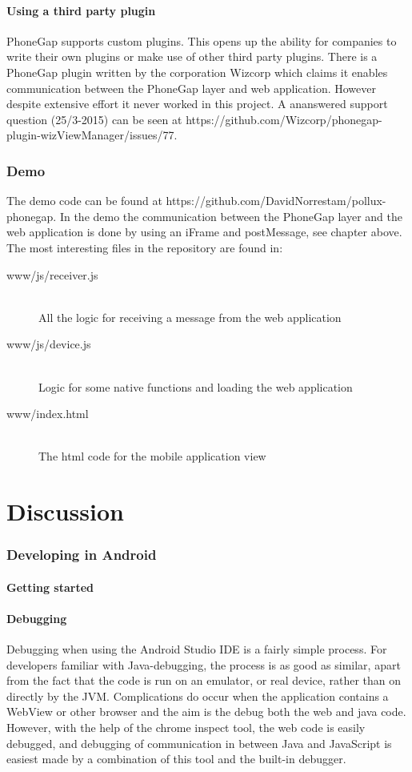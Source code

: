 \documentclass{cslthse-msc}
\begin{document}
\subsubsection{Using a third party plugin}
PhoneGap supports custom plugins. This opens up the ability for companies to write their own plugins or make use of other third party plugins.
\newline\newline
There is a PhoneGap plugin written by the corporation Wizcorp which claims it enables communication between the PhoneGap layer and web application. However despite extensive effort it never worked in this project. A ananswered support question (25/3-2015) can be seen at https://github.com/Wizcorp/phonegap-plugin-wizViewManager/issues/77. 

\subsection{Demo}
The demo code can be found at https://github.com/DavidNorrestam/pollux-phonegap. In the demo the communication between the PhoneGap layer and the web application is done by using an iFrame and postMessage, see chapter above. The most interesting files in the repository are found in:

\begin{description}
  \item[www/js/receiver.js] \hfill \\
    All the logic for receiving a message from the web application
  \item[www/js/device.js] \hfill \\
    Logic for some native functions and loading the web application
  \item[www/index.html] \hfill \\
    The html code for the mobile application view
\end{description}

\chapter{Discussion}
\subsection{Developing in Android}
\subsubsection{Getting started}
\subsubsection{Debugging}
Debugging when using the Android Studio IDE is a fairly simple process. For developers familiar with Java-debugging, the process is as good as similar, apart from the fact that the code is run on an emulator, or real device, rather than on directly by the JVM. Complications do occur when the application contains a WebView or other browser and the aim is the debug both the web and java code. However, with the help of the chrome inspect tool, the web code is easily debugged, and debugging of communication in between Java and JavaScript is easiest made by a combination of this tool and the built-in debugger. 
\end{document}
